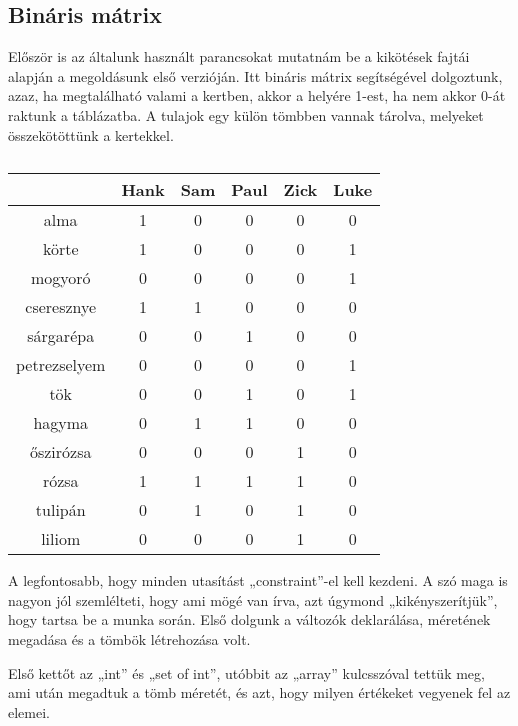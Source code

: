 \documentclass[12pt,a4paper,twoside, openright]{report}
\begin{document}

\subsection{Bináris mátrix}

    Először is az általunk használt parancsokat mutatnám be a kikötések fajtái alapján a megoldásunk első verzióján.
    Itt bináris mátrix segítségével dolgoztunk, azaz, ha megtalálható valami a kertben, akkor a helyére 1-est, ha nem akkor 0-át raktunk a táblázatba.
    A tulajok egy külön tömbben vannak tárolva, melyeket összekötöttünk a kertekkel.
	
	\begin{table}
		\centering
		\caption{}
		\begin{tabular}{|c|c|c|c|c|c|}
			\hline 
			& Hank & Sam & Paul & Zick & Luke \\ 
			\hline 
			alma & 1 & 0 & 0 & 0 & 0 \\ 
			\hline 
			körte & 1 & 0 & 0 & 0 & 1 \\ 
			\hline 
			mogyoró & 0 & 0 & 0 & 0 & 1 \\ 
			\hline 
			cseresznye & 1 & 1 & 0 & 0 & 0 \\ 
			\hline 
			sárgarépa & 0 & 0 & 1 & 0 & 0 \\ 
			\hline 
			petrezselyem & 0 & 0 & 0 & 0 & 1 \\ 
			\hline 
			tök & 0 & 0 & 1 & 0 & 1 \\ 
			\hline 
			hagyma & 0 & 1 & 1 & 0 & 0 \\ 
			\hline 
			őszirózsa & 0 & 0 & 0 & 1 & 0 \\ 
			\hline 
			rózsa & 1 & 1 & 1 & 1 & 0 \\ 
			\hline 
			tulipán & 0 & 1 & 0 & 1 & 0 \\ 
			\hline 
			liliom & 0 & 0 & 0 & 1 & 0 \\ 
			\hline 
		\end{tabular}
	\end{table}
     
    A legfontosabb, hogy minden utasítást „constraint”-el kell kezdeni.
    A szó maga is nagyon jól szemlélteti, hogy ami mögé van írva, azt úgymond „kikényszerítjük”, hogy tartsa be a munka során.
    Első dolgunk a változók deklarálása, méretének megadása és a tömbök létrehozása volt.

    Első kettőt az „int” és „set of int”, utóbbit az „array” kulcsszóval tettük meg, ami után megadtuk a tömb méretét, és azt, hogy milyen értékeket vegyenek fel az elemei.
\end{document}
